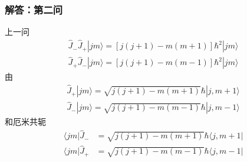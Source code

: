 \subsubsection{解答：第二问}
上一问
\begin{equation}
    \begin{aligned}
        \hat{J}_-\hat{J}_+|jm\rangle =\left[ j\left( j+1 \right) -m\left( m+1 \right) \right] \hbar ^2|jm\rangle 
\\
\hat{J}_+\hat{J}_-|jm\rangle =\left[ j\left( j+1 \right) -m\left( m-1 \right) \right] \hbar ^2|jm\rangle 
    \end{aligned}
\end{equation}
由
\begin{equation}
    \begin{aligned}
        \hat{J}_+|jm\rangle =\sqrt{j\left( j+1 \right) -m\left( m+1 \right)}\hbar |j,m+1\rangle 
\\
\hat{J}_-|jm\rangle =\sqrt{j\left( j+1 \right) -m\left( m-1 \right)}\hbar |j,m-1\rangle 
    \end{aligned}
\end{equation}
和厄米共轭
\begin{equation}
    \begin{aligned}
        \langle jm|\hat{J}_-&=\sqrt{j\left( j+1 \right) -m\left( m+1 \right)}\hbar \langle j,m+1|
\\
\langle jm|\hat{J}_+&=\sqrt{j\left( j+1 \right) -m\left( m-1 \right)}\hbar \langle j,m-1|
    \end{aligned}
\end{equation}

